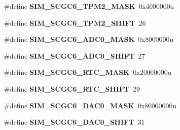 \begin{DoxyCompactItemize}
\item 
\hypertarget{group___s_i_m___register___masks_ga6e18a8c1e42f318d03294d14df255132}{}\#define {\bfseries S\+I\+M\+\_\+\+S\+C\+G\+C6\+\_\+\+T\+P\+M2\+\_\+\+M\+A\+S\+K}~0x4000000u\label{group___s_i_m___register___masks_ga6e18a8c1e42f318d03294d14df255132}

\item 
\hypertarget{group___s_i_m___register___masks_gafc1cb84a2b2b306b043c31ed98213ff0}{}\#define {\bfseries S\+I\+M\+\_\+\+S\+C\+G\+C6\+\_\+\+T\+P\+M2\+\_\+\+S\+H\+I\+F\+T}~26\label{group___s_i_m___register___masks_gafc1cb84a2b2b306b043c31ed98213ff0}

\item 
\hypertarget{group___s_i_m___register___masks_ga481c725e02da6a245c9d715307969f09}{}\#define {\bfseries S\+I\+M\+\_\+\+S\+C\+G\+C6\+\_\+\+A\+D\+C0\+\_\+\+M\+A\+S\+K}~0x8000000u\label{group___s_i_m___register___masks_ga481c725e02da6a245c9d715307969f09}

\item 
\hypertarget{group___s_i_m___register___masks_ga3f62de5fc5ccaa13d6975cf1e0ebba03}{}\#define {\bfseries S\+I\+M\+\_\+\+S\+C\+G\+C6\+\_\+\+A\+D\+C0\+\_\+\+S\+H\+I\+F\+T}~27\label{group___s_i_m___register___masks_ga3f62de5fc5ccaa13d6975cf1e0ebba03}

\item 
\hypertarget{group___s_i_m___register___masks_gad51b16006c9f793c4b342ea1ff91a846}{}\#define {\bfseries S\+I\+M\+\_\+\+S\+C\+G\+C6\+\_\+\+R\+T\+C\+\_\+\+M\+A\+S\+K}~0x20000000u\label{group___s_i_m___register___masks_gad51b16006c9f793c4b342ea1ff91a846}

\item 
\hypertarget{group___s_i_m___register___masks_gac04e5a3a7a2848658a30e7c89f791f39}{}\#define {\bfseries S\+I\+M\+\_\+\+S\+C\+G\+C6\+\_\+\+R\+T\+C\+\_\+\+S\+H\+I\+F\+T}~29\label{group___s_i_m___register___masks_gac04e5a3a7a2848658a30e7c89f791f39}

\item 
\hypertarget{group___s_i_m___register___masks_ga67d96adcce9fece065ce6a7f57f495a1}{}\#define {\bfseries S\+I\+M\+\_\+\+S\+C\+G\+C6\+\_\+\+D\+A\+C0\+\_\+\+M\+A\+S\+K}~0x80000000u\label{group___s_i_m___register___masks_ga67d96adcce9fece065ce6a7f57f495a1}

\item 
\hypertarget{group___s_i_m___register___masks_ga263123e8c1970021957fa8e72cf4a25a}{}\#define {\bfseries S\+I\+M\+\_\+\+S\+C\+G\+C6\+\_\+\+D\+A\+C0\+\_\+\+S\+H\+I\+F\+T}~31\label{group___s_i_m___register___masks_ga263123e8c1970021957fa8e72cf4a25a}


\end{DoxyCompactItemize}
